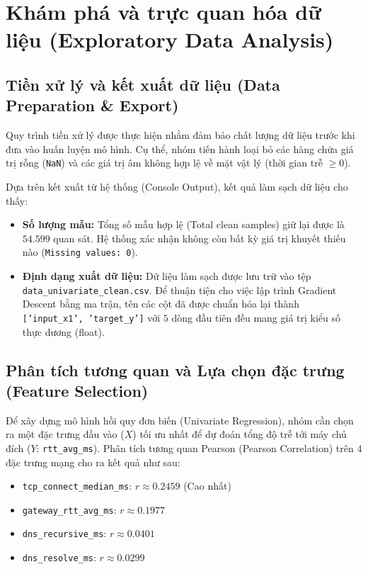 \section{Khám phá và trực quan hóa dữ liệu (Exploratory Data Analysis)}

\subsection{Tiền xử lý và kết xuất dữ liệu (Data Preparation \& Export)}
Quy trình tiền xử lý được thực hiện nhằm đảm bảo chất lượng dữ liệu trước khi đưa vào huấn luyện mô hình. Cụ thể, nhóm tiến hành loại bỏ các hàng chứa giá trị rỗng (\texttt{NaN}) và các giá trị âm không hợp lệ về mặt vật lý (thời gian trễ $\ge 0$). 

Dựa trên kết xuất từ hệ thống (Console Output), kết quả làm sạch dữ liệu cho thấy:
\begin{itemize}
    \item \textbf{Số lượng mẫu:} Tổng số mẫu hợp lệ (Total clean samples) giữ lại được là $54.599$ quan sát. Hệ thống xác nhận không còn bất kỳ giá trị khuyết thiếu nào (\texttt{Missing values: 0}).
    \item \textbf{Định dạng xuất dữ liệu:} Dữ liệu làm sạch được lưu trữ vào tệp \texttt{data\_univariate\_clean.csv}. Để thuận tiện cho việc lập trình Gradient Descent bằng ma trận, tên các cột đã được chuẩn hóa lại thành \texttt{['input\_x1', 'target\_y']} với $5$ dòng đầu tiên đều mang giá trị kiểu số thực dương (float).
\end{itemize}

\subsection{Phân tích tương quan và Lựa chọn đặc trưng (Feature Selection)}
Để xây dựng mô hình hồi quy đơn biến (Univariate Regression), nhóm cần chọn ra một đặc trưng đầu vào ($X$) tối ưu nhất để dự đoán tổng độ trễ tới máy chủ đích ($Y$: \texttt{rtt\_avg\_ms}). Phân tích tương quan Pearson (Pearson Correlation) trên $4$ đặc trưng mạng cho ra kết quả như sau:
\begin{itemize}
    \item \texttt{tcp\_connect\_median\_ms}: $r \approx 0.2459$ (Cao nhất)
    \item \texttt{gateway\_rtt\_avg\_ms}: $r \approx 0.1977$
    \item \texttt{dns\_recursive\_ms}: $r \approx 0.0401$
    \item \texttt{dns\_resolve\_ms}: $r \approx 0.0299$
\end{itemize}

